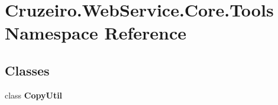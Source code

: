\hypertarget{namespace_cruzeiro_1_1_web_service_1_1_core_1_1_tools}{}\section{Cruzeiro.\+Web\+Service.\+Core.\+Tools Namespace Reference}
\label{namespace_cruzeiro_1_1_web_service_1_1_core_1_1_tools}
\subsection*{Classes}
\begin{DoxyCompactItemize}
\item 
class {\bfseries Copy\+Util}
\end{DoxyCompactItemize}
